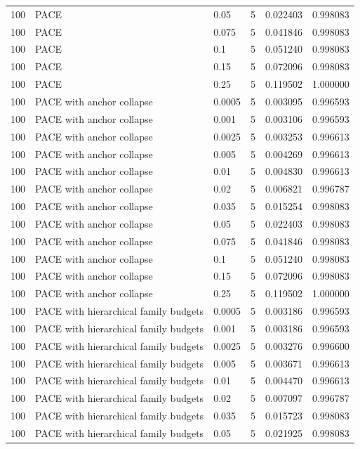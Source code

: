 \begin{tabular}{llllll}
100 & PACE & 0.05 & 5 & 0.022403 & 0.998083 \\
100 & PACE & 0.075 & 5 & 0.041846 & 0.998083 \\
100 & PACE & 0.1 & 5 & 0.051240 & 0.998083 \\
100 & PACE & 0.15 & 5 & 0.072096 & 0.998083 \\
100 & PACE & 0.25 & 5 & 0.119502 & 1.000000 \\
100 & PACE with anchor collapse & 0.0005 & 5 & 0.003095 & 0.996593 \\
100 & PACE with anchor collapse & 0.001 & 5 & 0.003106 & 0.996593 \\
100 & PACE with anchor collapse & 0.0025 & 5 & 0.003253 & 0.996613 \\
100 & PACE with anchor collapse & 0.005 & 5 & 0.004269 & 0.996613 \\
100 & PACE with anchor collapse & 0.01 & 5 & 0.004830 & 0.996613 \\
100 & PACE with anchor collapse & 0.02 & 5 & 0.006821 & 0.996787 \\
100 & PACE with anchor collapse & 0.035 & 5 & 0.015254 & 0.998083 \\
100 & PACE with anchor collapse & 0.05 & 5 & 0.022403 & 0.998083 \\
100 & PACE with anchor collapse & 0.075 & 5 & 0.041846 & 0.998083 \\
100 & PACE with anchor collapse & 0.1 & 5 & 0.051240 & 0.998083 \\
100 & PACE with anchor collapse & 0.15 & 5 & 0.072096 & 0.998083 \\
100 & PACE with anchor collapse & 0.25 & 5 & 0.119502 & 1.000000 \\
100 & PACE with hierarchical family budgets & 0.0005 & 5 & 0.003186 & 0.996593 \\
100 & PACE with hierarchical family budgets & 0.001 & 5 & 0.003186 & 0.996593 \\
100 & PACE with hierarchical family budgets & 0.0025 & 5 & 0.003276 & 0.996600 \\
100 & PACE with hierarchical family budgets & 0.005 & 5 & 0.003671 & 0.996613 \\
100 & PACE with hierarchical family budgets & 0.01 & 5 & 0.004470 & 0.996613 \\
100 & PACE with hierarchical family budgets & 0.02 & 5 & 0.007097 & 0.996787 \\
100 & PACE with hierarchical family budgets & 0.035 & 5 & 0.015723 & 0.998083 \\
100 & PACE with hierarchical family budgets & 0.05 & 5 & 0.021925 & 0.998083 \\

\end{tabular}
